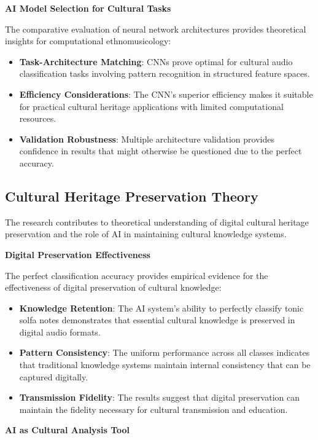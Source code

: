 \documentclass[12pt,a4paper]{article}
\begin{document}
\textbf{AI Model Selection for Cultural Tasks}

The comparative evaluation of neural network architectures provides theoretical insights for computational ethnomusicology:

\begin{itemize}
\item \textbf{Task-Architecture Matching}: CNNs prove optimal for cultural audio classification tasks involving pattern recognition in structured feature spaces.
\item \textbf{Efficiency Considerations}: The CNN's superior efficiency makes it suitable for practical cultural heritage applications with limited computational resources.
\item \textbf{Validation Robustness}: Multiple architecture validation provides confidence in results that might otherwise be questioned due to the perfect accuracy.
\end{itemize}

\subsection{Cultural Heritage Preservation Theory}

The research contributes to theoretical understanding of digital cultural heritage preservation and the role of AI in maintaining cultural knowledge systems.

\textbf{Digital Preservation Effectiveness}

The perfect classification accuracy provides empirical evidence for the effectiveness of digital preservation of cultural knowledge:

\begin{itemize}
\item \textbf{Knowledge Retention}: The AI system's ability to perfectly classify tonic solfa notes demonstrates that essential cultural knowledge is preserved in digital audio formats.
\item \textbf{Pattern Consistency}: The uniform performance across all classes indicates that traditional knowledge systems maintain internal consistency that can be captured digitally.
\item \textbf{Transmission Fidelity}: The results suggest that digital preservation can maintain the fidelity necessary for cultural transmission and education.
\end{itemize}

\textbf{AI as Cultural Analysis Tool}
\end{document}
